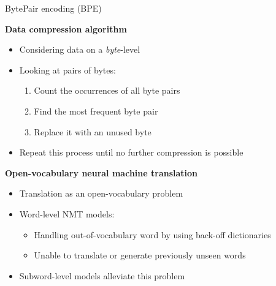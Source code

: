\documentclass[]{beamer}
\begin{document}
\begin{frame}{BytePair encoding (BPE)}

	\textbf{Data compression algorithm \href{https://www.derczynski.com/papers/archive/BPE_Gage.pdf}{}}

	\begin{itemize}
		\item Considering data on a \textit{byte}-level
		\item Looking at pairs of bytes:
			\begin{enumerate}
				\item Count the occurrences of all byte pairs
				\item Find the most frequent byte pair
				\item Replace it with an unused byte
			\end{enumerate}
		\item Repeat this process until no further compression is possible
	\end{itemize}
	
	\vspace{.3cm}
	
	\textbf{Open-vocabulary neural machine translation \href{https://www.aclweb.org/anthology/P16-1162.pdf}{}}
	
	\begin{itemize}
		\item Translation as an open-vocabulary problem
		\item Word-level NMT models:
			\begin{itemize}
				\item Handling out-of-vocabulary word by using back-off dictionaries
				\item Unable to translate or generate previously unseen words
			\end{itemize}
		\item Subword-level models alleviate this problem
	\end{itemize}
\end{frame}
\end{document}
